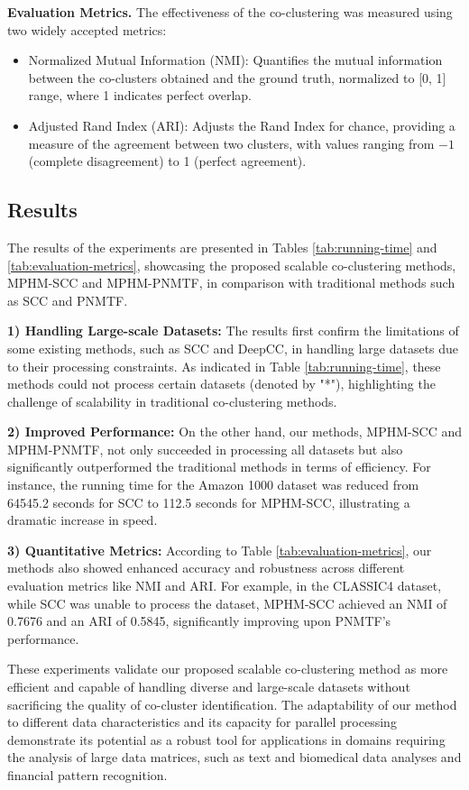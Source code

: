 \documentclass[journal]{IEEEtran}
\begin{document}
\textbf{Evaluation Metrics.}
The effectiveness of the co-clustering was measured using two widely accepted metrics:

\begin{itemize}
  \item Normalized Mutual Information (NMI): Quantifies the mutual information between the co-clusters obtained and the ground truth, normalized to [0, 1] range, where 1 indicates perfect overlap.
  \item Adjusted Rand Index (ARI): Adjusts the Rand Index for chance, providing a measure of the agreement between two clusters, with values ranging from $-1$ (complete disagreement) to 1 (perfect agreement).
\end{itemize}

\subsection{Results}
The results of the experiments are presented in Tables \ref{tab:running-time} and \ref{tab:evaluation-metrics}, showcasing the proposed scalable co-clustering methods, MPHM-SCC and MPHM-PNMTF, in comparison with traditional methods such as SCC and PNMTF.

\textbf{1) Handling Large-scale Datasets:} The results first confirm the limitations of some existing methods, such as SCC and DeepCC, in handling large datasets due to their processing constraints. As indicated in Table \ref{tab:running-time}, these methods could not process certain datasets (denoted by "*"), highlighting the challenge of scalability in traditional co-clustering methods.

\textbf{2) Improved Performance:} On the other hand, our methods, MPHM-SCC and MPHM-PNMTF, not only succeeded in processing all datasets but also significantly outperformed the traditional methods in terms of efficiency. For instance, the running time for the Amazon 1000 dataset was reduced from 64545.2 seconds for SCC to 112.5 seconds for MPHM-SCC, illustrating a dramatic increase in speed.

\textbf{3) Quantitative Metrics:} According to Table \ref{tab:evaluation-metrics}, our methods also showed enhanced accuracy and robustness across different evaluation metrics like NMI and ARI. For example, in the CLASSIC4 dataset, while SCC was unable to process the dataset, MPHM-SCC achieved an NMI of 0.7676 and an ARI of 0.5845, significantly improving upon PNMTF's performance.

These experiments validate our proposed scalable co-clustering method as more efficient and capable of handling diverse and large-scale datasets without sacrificing the quality of co-cluster identification. The adaptability of our method to different data characteristics and its capacity for parallel processing demonstrate its potential as a robust tool for applications in domains requiring the analysis of large data matrices, such as text and biomedical data analyses and financial pattern recognition.
\end{document}
